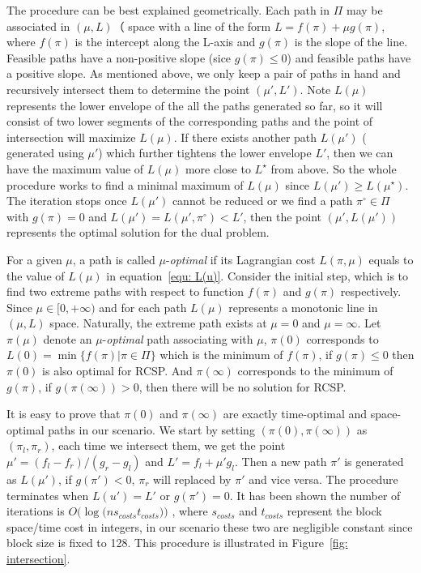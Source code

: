 \documentclass{sig-alternate-05-2015}
\begin{document}
The procedure can be best explained geometrically.
Each path in $ \Pi $ may be associated in $ (\mu, L)（$ space with a line of the form $ L = f(\pi) + \mu g(\pi) $, where $ f(\pi) $ is the intercept along the L-axis and $ g(\pi) $ is the slope of the line.
Feasible paths have a non-positive slope (sice $ g(\pi) \leqslant 0 $) and feasible paths have a positive slope.
As mentioned above, we only keep a pair of paths in hand and recursively intersect them to determine the point $ (\mu',L') $.
Note $ L(\mu) $ represents the lower envelope of the all the paths generated so far, so it will consist of two lower segments of the corresponding paths and the point of intersection will maximize $ L(\mu) $.
If there exists another path $ L(\mu') $ ( generated using $ \mu' $) which further tightens the lower envelope $ L' $, then we can have the maximum value of $ L(\mu) $ more close to $ L^\star $ from above.
So the whole procedure works to find a minimal maximum of $ L(\mu) $ since $ L(\mu') \geqslant L(\mu^\star) $.
The iteration stops once $ L(\mu') $ cannot be reduced or we find a path $ \pi^\circ \in \Pi $ with $ g(\pi) = 0 $ and $ L(\mu') = L(\mu', \pi^\circ) < L' $, then the point $ (\mu', L(\mu')) $ represents the optimal solution for the dual problem.

For a given $ \mu $, a path is called $ \mu $-\textit{optimal} if its Lagrangian cost $ L(\pi,\mu) $ equals to the value of $ L(\mu) $ in equation~\eqref{equ: L(u)}.
Consider the initial step, which is to find two extreme paths with respect to function $ f(\pi) $ and $ g(\pi) $ respectively.
Since $ \mu \in [0,+\infty) $ and for each path $ L(\mu) $ represents a monotonic line in $ (\mu,L) $ space.
Naturally, the extreme path exists at $ \mu = 0 $ and $ \mu=\infty $.
Let $ \pi(\mu) $ denote an $ \mu $-\textit{optimal} path associating with $ \mu $,
$ \pi(0) $ corresponds to $ L(0) = \min\{f(\pi)|\pi \in \Pi\} $ which is the minimum of $ f(\pi) $, if $ g(\pi) \leqslant 0 $ then $ \pi(0) $ is also optimal for RCSP.
And $ \pi(\infty) $ corresponds to the minimum of $ g(\pi) $, if $ g(\pi(\infty)) > 0 $, then there will be no solution for RCSP.

It is easy to prove that $ \pi(0) $ and $ \pi(\infty) $ are exactly time-optimal and space-optimal paths in our scenario.
We start by setting $ (\pi(0),\pi(\infty)) $ as $ (\pi_l,\pi_r) $, each time we intersect them, we get the point $ \mu' = (f_l - f_r)/(g_r-g_l) $ and $ L'= f_l + \mu' g_l $.
Then a new path $ \pi' $ is generated as $ L(\mu') $, if $ g(\pi') < 0 $, $ \pi_r $ will replaced by $ \pi' $ and vice versa.
The procedure terminates when $ L(u') = L' $ or $ g(\pi') = 0 $.
It has been shown the number of iterations is $ O(\log(n $$ s_{costs} $$ t_{costs})) $ \cite{mehlhorn2000resource}, where $ s_{costs} $ and $ t_{costs} $ represent the block space/time cost in integers, in our scenario these two are negligible constant since block size is fixed to 128.
This procedure is illustrated in Figure~\ref{fig: intersection}.
\end{document}
